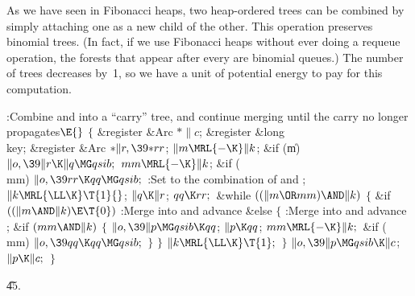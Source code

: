 As we have seen in Fibonacci heaps, two heap-ordered trees can be
combined
by simply attaching one as a new child of the other. This operation preserves
binomial trees. (In fact, if we use Fibonacci heaps without ever doing
a requeue operation, the forests that appear after every 
are binomial queues.) The number of trees decreases by~1, so we have a
unit of potential energy to pay for this computation.

\Y\B\4:Combine  and  into a ``carry'' tree, and continue
merging until the carry no longer propagates\X${}\E{}$\6
${}\{{}$\5
\1\&{register} \&{Arc} ${}{*}\|c{}$;\6
\&{register} \&{long} \\{key};\6
\&{register} \&{Arc} ${}{*}\|r,\39{*}\\{rr}{}$;\7
${}\|m\MRL{-{\K}}\|k{}$;\5
\&{if} (\|m)\1\5
${}\|o,\39\|r\K\|q\MG\\{qsib};{}$\2\6
${}\\{mm}\MRL{-{\K}}\|k{}$;\5
\&{if} (\\{mm})\1\5
${}\|o,\39\\{rr}\K\\{qq}\MG\\{qsib};{}$\2\6
:Set  to the combination of  and \X;\6
${}\|k\MRL{{\LL}{\K}}\T{1}{}$;\5
${}\|q\K\|r{}$;\5
${}\\{qq}\K\\{rr};{}$\6
\&{while} ${}((\|m\OR\\{mm})\AND\|k){}$\5
${}\{{}$\1\6
\&{if} ${}((\|m\AND\|k)\E\T{0}){}$\1\5
:Merge  into  and advance \X\2\6
\&{else}\5
${}\{{}$\1\6
:Merge  into  and advance \X;\6
\&{if} ${}(\\{mm}\AND\|k){}$\5
${}\{{}$\1\6
${}\|o,\39\|p\MG\\{qsib}\K\\{qq}{}$;\5
${}\|p\K\\{qq}{}$;\5
${}\\{mm}\MRL{-{\K}}\|k;{}$\6
\&{if} (\\{mm})\1\5
${}\|o,\39\\{qq}\K\\{qq}\MG\\{qsib};{}$\2\6
\4${}\}{}$\2\6
\4${}\}{}$\2\6
${}\|k\MRL{{\LL}{\K}}\T{1};{}$\6
\4${}\}{}$\2\6
${}\|o,\39\|p\MG\\{qsib}\K\|c{}$;\5
${}\|p\K\|c;{}$\6
\4${}\}{}$\2\par
\U45.\fi

